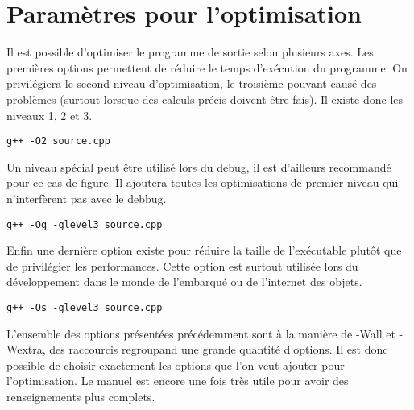 \documentclass[a4paper, 12pt]{article}
\begin{document}
\section{Paramètres pour l'optimisation}
Il est possible d'optimiser le programme de sortie selon plusieurs axes. Les premières options permettent de réduire le temps d'exécution du programme.
On privilégiera le second niveau d'optimisation, le troisième pouvant causé des problèmes (surtout lorsque des calculs précis doivent être fais).
Il existe donc les niveaux 1, 2 et 3.
\begin{mdframed}[backgroundcolor=light-gray, roundcorner=20pt,
    innerleftmargin=20, innertopmargin=1, innerbottommargin=1, 
    outerlinewidth=1, linecolor=darkgray]
    \begin{lstlisting}
g++ -O2 source.cpp
    \end{lstlisting}
\end{mdframed}
Un niveau spécial peut être utilisé lors du debug, il est d'ailleurs recommandé pour ce cas de figure. Il ajoutera toutes les optimisations de premier niveau qui n'interfèrent pas avec le debbug.
\begin{mdframed}[backgroundcolor=light-gray, roundcorner=20pt,
    innerleftmargin=20, innertopmargin=1, innerbottommargin=1, 
    outerlinewidth=1, linecolor=darkgray]
    \begin{lstlisting}
g++ -Og -glevel3 source.cpp
    \end{lstlisting}
\end{mdframed}
Enfin une dernière option existe pour réduire la taille de l'exécutable plutôt que de privilégier les performances.
Cette option est surtout utilisée lors du développement dans le monde de l'embarqué ou de l'internet des objets.
\begin{mdframed}[backgroundcolor=light-gray, roundcorner=20pt,
    innerleftmargin=20, innertopmargin=1, innerbottommargin=1, 
    outerlinewidth=1, linecolor=darkgray]
    \begin{lstlisting}
g++ -Os -glevel3 source.cpp
    \end{lstlisting}
\end{mdframed}
L'ensemble des options présentées précédemment sont à la manière de -Wall et -Wextra, des raccourcis regroupand une grande quantité d'options.
Il est donc possible de choisir exactement les options que l'on veut ajouter pour l'optimisation. Le manuel est encore une fois très utile pour avoir des renseignements plus complets.
\end{document}
